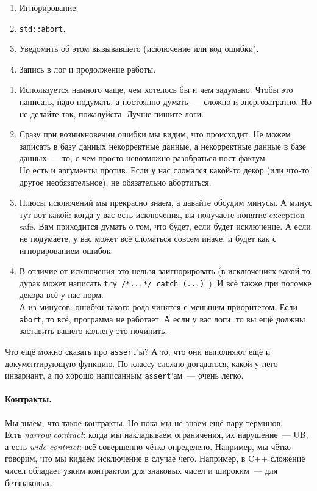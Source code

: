 \documentclass{article}
\begin{document}
    \begin{enumerate}
        \item Игнорирование.
        \item \texttt{std::abort}.
        \item Уведомить об этом вызывавшего (исключение или код ошибки).
        \item Запись в лог и продолжение работы.
    \end{enumerate}
    \begin{enumerate}
        \item Используется намного чаще, чем хотелось бы и чем задумано. Чтобы это написать, надо подумать, а постоянно думать~--- сложно и энергозатратно. Но не делайте так, пожалуйста. Лучше пишите логи.
        \item Сразу при возникновении ошибки мы видим, что происходит. Не можем записать в базу данных некорректные данные, а некорректные данные в базе данных~--- то, с чем просто невозможно разобраться пост-фактум.\\
        Но есть и аргументы против. Если у нас сломался какой-то декор (или что-то другое необязательное), не обязательно абортиться.
        \item Плюсы исключений мы прекрасно знаем, а давайте обсудим минусы. А минус тут вот какой: когда у вас есть исключения, вы получаете понятие exception-safe. Вам приходится думать о том, что будет, если будет исключение. А если не подумаете, у вас может всё сломаться совсем иначе, и будет как с игнорированием ошибок.
        \item В отличие от исключения это нельзя заигнорировать (в исключениях какой-то дурак может написать \texttt{try {/*...*/} catch (...) {}}). И всё также при поломке декора всё у нас норм.\\
        А из минусов: ошибки такого рода чинятся с меньшим приоритетом. Если \texttt{abort}, то всё, программа не работает. А если у вас логи, то вы ещё должны заставить вашего коллегу это починить.
    \end{enumerate}
    Что ещё можно сказать про \texttt{assert}'ы? А то, что они выполняют ещё и документирующую функцию. По классу сложно догадаться, какой у него инвариант, а по хорошо написанным \texttt{assert}'ам~--- очень легко.
    \paragraph{Контракты.}
    Мы знаем, что такое контракты. Но пока мы не знаем ещё пару терминов.\\
    Есть \textit{narrow contract}: когда мы накладываем ограничения, их нарушение~--- UB, а есть \textit{wide contract}: всё совершенно чётко определено. Например, мы чётко говорим, что мы кидаем исключение в случае чего. Например, в C++ сложение чисел обладает узким контрактом для знаковых чисел и широким~--- для беззнаковых.
\end{document}
